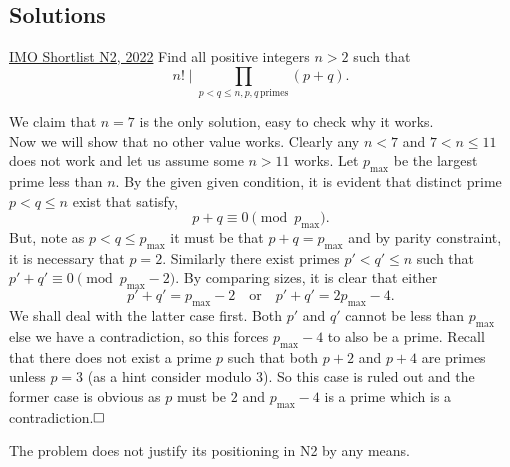 \subsection{Solutions}
\begin{problem}{1}{\href{https://artofproblemsolving.com/community/q2h3107356p34893836}{IMO Shortlist N2, 2022}}
	Find all positive integers $n>2$ such that
$$ n! \mid \prod_{ p<q\le n, p,q \, \text{primes}} (p+q).$$
	\begin{solution} We claim that $n=7$ is the only solution, easy to check why it works.\\
	\indent Now we will show that no other value works. Clearly any $n<7$ and $7< n\le 11$ does not work and let us assume some $n>11$ works. Let $p_{\text{max}}$ be the largest prime less than $n$. By the given given condition, it is evident that distinct prime $p<q\le n$ exist that satisfy,
$$p+q\equiv 0\pmod{p_{\text{max}}}.$$But, note as $p<q\le p_{\text{max}}$ it must be that $p+q=p_{\text{max}}$ and by parity constraint, it is necessary that $p=2$. Similarly there exist primes $p'<q'\le n$ such that $p'+q'\equiv 0\pmod{p_{\text{max}}-2}$. By comparing sizes, it is clear that either
$$p'+q'=p_{\text{max}}-2\quad\text{or}\quad p'+q'=2p_{\text{max}}-4.$$We shall deal with the latter case first. Both $p'$ and $q'$ cannot be less than $p_{\text{max}}$ else we have a contradiction, so this forces $p_{\text{max}}-4$ to also be a prime. Recall that there does not exist a prime $p$ such that both $p+2$ and $p+4$ are primes unless $p=3$ (as a hint consider modulo $3$). So this case is ruled out and the former case is obvious as $p$ must be $2$ and $p_{\text{max}}-4$ is a prime which is a contradiction.$\qedwhite$

	\begin{remark}[title=Comment.$\hspace{1mm}$]
	The problem does not justify its positioning in N2 by any means.
	\end{remark}
	\end{solution}
\end{problem}
	
